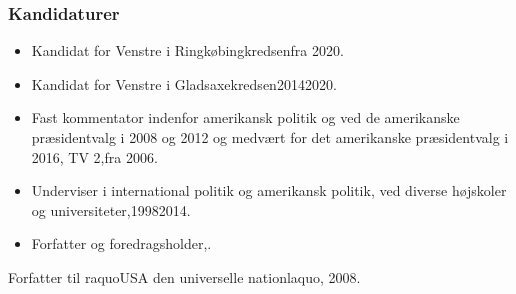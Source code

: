 \documentclass[11pt, a4paper]{awesome-cv}
\begin{document}
\begin{cvletter}
\subsubsection*{Kandidaturer}
\begin{itemize}
\item Kandidat for Venstre i Ringkøbingkredsenfra 2020.
\item Kandidat for Venstre i Gladsaxekredsen20142020.
\end{itemize}
\begin{itemize}
\item Fast kommentator indenfor amerikansk politik og ved de amerikanske præsidentvalg i 2008 og 2012 og medvært for det amerikanske præsidentvalg i 2016, TV 2,fra 2006.
\item Underviser i international politik og amerikansk politik, ved diverse højskoler og universiteter,19982014.
\item Forfatter og foredragsholder,.
\end{itemize}
Forfatter til raquoUSA  den universelle nationlaquo, 2008.

\end{cvletter}
\end{document}
